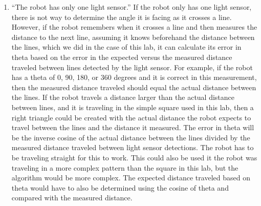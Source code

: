 \documentclass[twocolumn]{article}
\begin{document}
\begin{enumerate}
\begin{enumerate}
\item ``The robot has only one light sensor.\cite{lab2}''
If the robot only has one light sensor, there is not way to determine the angle it is facing as it crosses a line. However, if the robot remembers when it crosses a line and then measures the distance to the next line, assuming it knows beforehand the distance between the lines, which we did in the case of this lab, it can calculate its error in theta based on the error in the expected versus the measured distance traveled between lines detected by the light sensor. For example, if the robot has a theta of 0, 90, 180, or 360 degrees and it is correct in this measurement, then the measured distance traveled should equal the actual distance between the lines. If the robot travels a distance larger than the actual distance between lines, and it is traveling in the simple square used in this lab, then a right triangle could be created with the actual distance the robot expects to travel between the lines and the distance it measured. The error in theta will be the inverse cosine of the actual distance between the lines divided by the measured distance traveled between light sensor detections. The robot has to be traveling straight for this to work. This could also be used it the robot was traveling in a more complex pattern than the square in this lab, but the algorithm would be more complex. The expected distance traveled based on theta would have to also be determined using the cosine of theta and compared with the measured distance.

\end{enumerate}

\end{enumerate}


\end{document}
